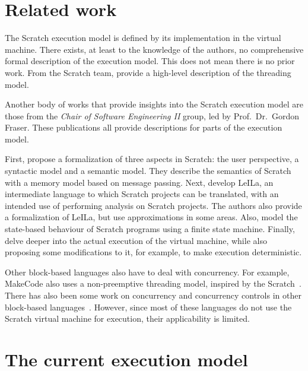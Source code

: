 \documentclass[../main]{subfiles}
\begin{document}
\section{Related work}\label{sec:execution-related-work}

The Scratch execution model is defined by its implementation in the virtual machine.
There exists, at least to the knowledge of the authors, no comprehensive formal description of the execution model.
This does not mean there is no prior work.
From the Scratch team, \textcite{maloneyScratchProgrammingLanguage2010a} provide a high-level description of the threading model.

Another body of works that provide insights into the Scratch execution model are those from the \emph{Chair of Software Engineering II} group, led by Prof.\ Dr.\ Gordon Fraser.
These publications all provide descriptions for parts of the execution model.

First, \textcite{stahlbauerTestingScratchPrograms2019} propose a formalization of three aspects in Scratch: the user perspective, a syntactic model and a semantic model.
They describe the semantics of Scratch with a memory model based on message passing.
Next, \textcite{stahlbauerVerifiedScratchProgram2020} develop LeILa, an intermediate language to which Scratch projects can be translated, with an intended use of performing analysis on Scratch projects.
The authors also provide a formalization of LeILa, but use approximations in some areas.
Also, \textcite{gotzModelbasedTestingScratch2022} model the state-based behaviour of Scratch programs using a finite state machine.
Finally, \textcite{deinerAutomatedTestGeneration2023} delve deeper into the actual execution of the virtual machine, while also proposing some modifications to it, for example, to make execution deterministic.

Other block-based languages also have to deal with concurrency.
For example, MakeCode also uses a non-preemptive threading model, inspired by the Scratch~\autocite{ballMicrosoftMakeCodeEmbedded2019a}.
There has also been some work on concurrency and concurrency controls in other block-based languages~\autocite{chungConCodeItComparisonConcurrency2020}.
However, since most of these languages do not use the Scratch virtual machine for execution, their applicability is limited.

\section{The current execution model}\label{sec:the-current-execution-model}
\end{document}
